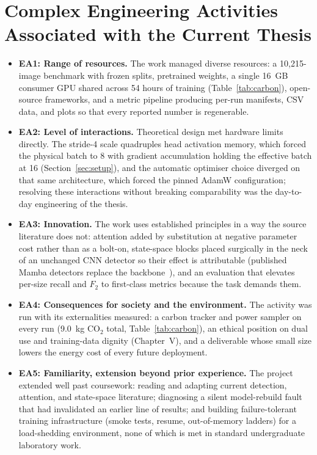 \section{Complex Engineering Activities Associated with the Current Thesis}
\begin{itemize}
  \item \textbf{EA1: Range of resources.} The work managed diverse
        resources: a 10{,}215-image benchmark with frozen splits, pretrained
        weights, a single 16~GB consumer GPU shared across 54 hours of
        training (Table~\ref{tab:carbon}), open-source frameworks, and a
        metric pipeline producing per-run manifests, CSV data, and plots so
        that every reported number is regenerable.
  \item \textbf{EA2: Level of interactions.} Theoretical design met hardware
        limits directly. The stride-4 scale quadruples head activation
        memory, which forced the physical batch to 8 with gradient
        accumulation holding the effective batch at 16 (Section~\ref{sec:setup}), and
        the automatic optimiser choice diverged on that same architecture,
        which forced the pinned AdamW configuration; resolving these
        interactions without breaking comparability was the day-to-day
        engineering of the thesis.
  \item \textbf{EA3: Innovation.} The work uses established principles in a
        way the source literature does not: attention added by substitution
        at negative parameter cost rather than as a bolt-on, state-space
        blocks placed surgically in the neck of an unchanged CNN detector so
        their effect is attributable (published Mamba detectors replace the
        backbone~\cite{wang2025mambayolo}), and an evaluation that elevates
        per-size recall and $F_2$ to first-class metrics because the task
        demands them.
  \item \textbf{EA4: Consequences for society and the environment.} The
        activity was run with its externalities measured: a carbon tracker
        and power sampler on every run (9.0~kg CO$_2$ total,
        Table~\ref{tab:carbon}), an ethical position on dual use and
        training-data dignity (Chapter~V), and a deliverable whose small
        size lowers the energy cost of every future deployment.
  \item \textbf{EA5: Familiarity, extension beyond prior experience.} The
        project extended well past coursework: reading and adapting current
        detection, attention, and state-space literature; diagnosing a
        silent model-rebuild fault that had invalidated an earlier line of
        results; and building failure-tolerant training infrastructure
        (smoke tests, resume, out-of-memory ladders) for a load-shedding
        environment, none of which is met in standard undergraduate
        laboratory work.
\end{itemize}

